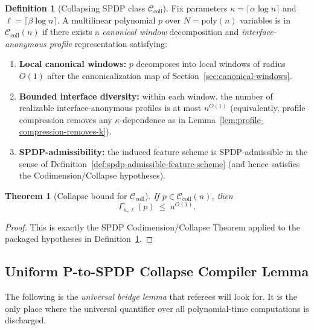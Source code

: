 \documentclass[12pt]{article}
\newcommand{\poly}{\mathrm{poly}}
\newtheorem{theorem}{Theorem}
\theoremstyle{definition}
\newtheorem{definition}{Definition}
\theoremstyle{definition}
\theoremstyle{remark}
\theoremstyle{remark}
\begin{document}
\begin{definition}[Collapsing SPDP class $\mathcal{C}_{\mathrm{coll}}$]
\label{def:collapsing-class}
Fix parameters $\kappa=\lceil \alpha \log n\rceil$ and $\ell=\lceil \beta \log n\rceil$.
A multilinear polynomial $p$ over $N=\poly(n)$ variables is in
$\mathcal{C}_{\mathrm{coll}}(n)$ if there exists a \emph{canonical window}
decomposition and \emph{interface-anonymous profile} representation satisfying:
\begin{enumerate}[label=(\roman*)]
\item \textbf{Local canonical windows:} $p$ decomposes into local windows of
radius $O(1)$ after the canonicalization map of
Section~\ref{sec:canonical-windows}.

\item \textbf{Bounded interface diversity:} within each window, the number of
realizable interface-anonymous profiles is at most $n^{O(1)}$ (equivalently,
profile compression removes any $\kappa$-dependence as in
Lemma~\ref{lem:profile-compression-removes-k}).

\item \textbf{SPDP-admissibility:} the induced feature scheme is SPDP-admissible
in the sense of Definition~\ref{def:spdp-admissible-feature-scheme}
(and hence satisfies the Codimension/Collapse hypotheses).

\end{enumerate}
\end{definition}

\begin{theorem}[Collapse bound for $\mathcal{C}_{\mathrm{coll}}$]
\label{thm:collapse-for-class}
If $p\in \mathcal{C}_{\mathrm{coll}}(n)$, then
\[
\Gamma_{\kappa,\ell}(p)\ \le\ n^{O(1)}.
\]
\end{theorem}

\begin{proof}
This is exactly the SPDP Codimension/Collapse Theorem applied to the packaged
hypotheses in Definition~\ref{def:collapsing-class}.
\end{proof}

\subsection{Uniform P-to-SPDP Collapse Compiler Lemma}
\label{subsec:p-to-spdp}

The following is the \emph{universal bridge lemma} that referees will look for.
It is the only place where the universal quantifier over all polynomial-time
computations is discharged.
\end{document}

